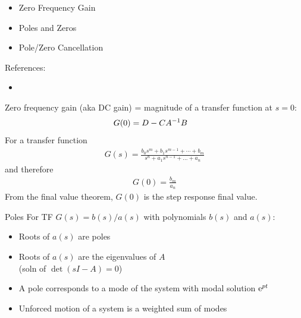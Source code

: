 \documentclass[10pt]{beamer-control}
\begin{document}

\begin{SUMMARY}
  \begin{itemize}
    \item Zero Frequency Gain
    \item Poles and Zeros
    \item Pole/Zero Cancellation
  \end{itemize}
  \vfill References:
  \begin{itemize}
    \item \astrom[§9.5]
  \end{itemize}
\end{SUMMARY}




\begin{frame}
  Zero frequency gain (aka \alert{DC gain}) = magnitude of a transfer function at $s=0$:
  \begin{align}
    G(0) &= D - CA^{-1} B
  \end{align}
  For a transfer function
  \begin{align}
    G(s) = \frac{b_0 s^m + b_1 s^{m-1} + \cdots + b_m}{s^n + a_1 s^{n-1} + \dots + a_n}
  \end{align}
  and therefore
  \begin{align}
    G(0) = \frac{b_m}{a_n}
  \end{align}
  From the final value theorem, $G(0)$ is the step response final value.
\end{frame}



\begin{frame}{Poles}
  For TF $G(s) = b(s)/a(s)$ with polynomials $b(s)$ and $a(s)$:
  \begin{itemize}
    \item Roots of $a(s)$ are \alert{poles}
    \item Roots of $a(s)$ are the eigenvalues of $A$ \\(soln of $\det(sI-A)=0$)
    \item A pole corresponds to a mode of the system with modal solution $\mathrm{e}^{pt}$
    \item Unforced motion of a system is a weighted sum of modes
  \end{itemize}
\end{frame}
\end{document}

